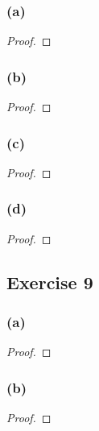 \documentclass[14pt]{extarticle}
\begin{document}
\subsubsection{(a)}

\begin{proof}

\end{proof}

\subsubsection{(b)}

\begin{proof}

\end{proof}

\subsubsection{(c)}

\begin{proof}

\end{proof}

\subsubsection{(d)}

\begin{proof}

\end{proof}

\subsection{Exercise 9}

\subsubsection{(a)}

\begin{proof}

\end{proof}

\subsubsection{(b)}

\begin{proof}

\end{proof}
\end{document}
